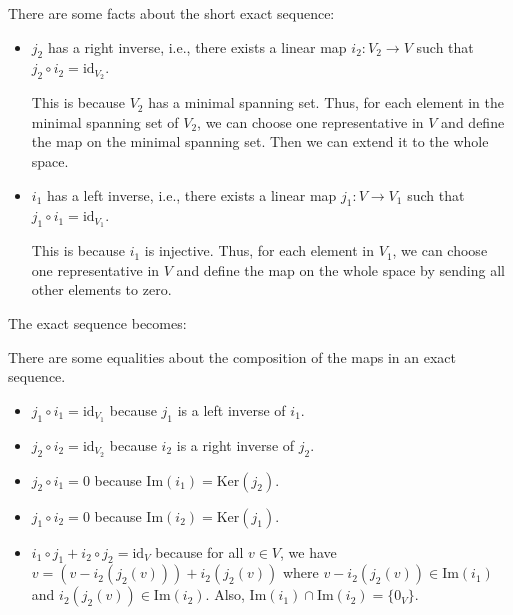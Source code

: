 \documentclass[
	11pt, %
	fleqn, %
	a4paper, %
]{LegrandOrangeBook}
\renewcommand{\ker}[1]{\text{Ker}(#1)} %
\renewcommand{\Im}[1]{\text{Im}(#1)} %
\newcommand{\id}{\text{id}} %
\begin{document}
\begin{example}
\begin{center}
    \end{center}

    There are some facts about the short exact sequence:
    \begin{itemize}
        \item $j_2$ has a right inverse, i.e., there exists a linear map $i_2 : V_2 \to V$ such that $j_2 \circ i_2 = \id_{V_2}$.
        
        This is because $V_2$ has a minimal spanning set. Thus, for each element in the minimal spanning set of $V_2$, we can choose one representative in $V$ and define the map on the minimal spanning set. Then we can extend it to the whole space.
        \item $i_1$ has a left inverse, i.e., there exists a linear map $j_1 : V \to V_1$ such that $j_1 \circ i_1 = \id_{V_1}$. 
        
        This is because $i_1$ is injective. Thus, for each element in $V_1$, we can choose one representative in $V$ and define the map on the whole space by sending all other elements to zero.
    \end{itemize}

    The exact sequence becomes:
    \begin{center}
    \end{center}

\end{example}

There are some equalities about the composition of the maps in an exact sequence.
\begin{itemize}
    \item $j_1 \circ i_1 = \id_{V_1}$ because $j_1$ is a left inverse of $i_1$.
    \item $j_2 \circ i_2 = \id_{V_2}$ because $i_2$ is a right inverse of $j_2$.
    \item $j_2 \circ i_1 = 0$ because $\Im{i_1} = \ker{j_2}$.
    \item $j_1 \circ i_2 = 0$ because $\Im{i_2} = \ker{j_1}$.
    \item $i_1 \circ j_1 + i_2 \circ j_2 = \id_V$ because for all $v \in V$, we have $v = (v - i_2(j_2(v))) + i_2(j_2(v))$ where $v - i_2(j_2(v)) \in \Im{i_1}$ and $i_2(j_2(v)) \in \Im{i_2}$. Also, $\Im{i_1} \cap \Im{i_2} = \{0_V\}$.
\end{itemize}
\end{document}
